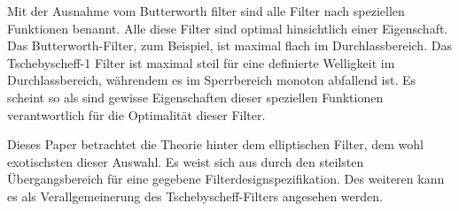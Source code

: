 Mit der Ausnahme vom Butterworth filter sind alle Filter nach speziellen Funktionen benannt.
Alle diese Filter sind optimal hinsichtlich einer Eigenschaft.
Das Butterworth-Filter, zum Beispiel, ist maximal flach im Durchlassbereich.
Das Tschebyscheff-1 Filter ist maximal steil für eine definierte Welligkeit im Durchlassbereich, währendem es im Sperrbereich monoton abfallend ist.
Es scheint so als sind gewisse Eigenschaften dieser speziellen Funktionen verantwortlich für die Optimalität dieser Filter.

Dieses Paper betrachtet die Theorie hinter dem elliptischen Filter, dem wohl exotischsten dieser Auswahl.
Es weist sich aus durch den steilsten Übergangsbereich für eine gegebene Filterdesignspezifikation.
Des weiteren kann es als Verallgemeinerung des Tschebyscheff-Filters angesehen werden.

